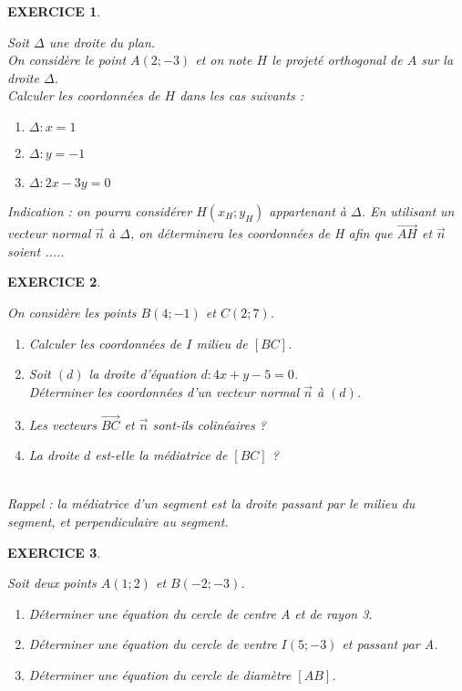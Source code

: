 \documentclass[a4paper]{article}   %
\renewcommand{\(}{\left(}
\renewcommand{\)}{\right)}
\newtheorem{EXO}{\large EXERCICE }
\newenvironment{EX}   { \setcounter{ques}{0} \begin{EXO} \hrulefill ~\vspace{0.3cm}

\normalfont}    {\end{EXO} \medskip}
\def\v{\overrightarrow}	%
\begin{document}
\begin{EX} Soit $\Delta$ une droite du plan.\\ On considère le point $A(2;-3)$ et on note $H$ le projeté orthogonal de $A$ sur la droite $\Delta$. \\
Calculer les coordonnées de $H$ dans les cas suivants :
\begin{enumerate}
\item $\Delta : x=1$
\item $\Delta : y=-1$
\item $\Delta : 2x-3y=0$
\end{enumerate}
{\small{Indication : on pourra considérer $H(x_H;y_H)$ appartenant à $\Delta$. En utilisant un vecteur normal $\v{n}$ à $\Delta$, on déterminera les coordonnées de H afin que $\v{AH}$ et $\v{n}$ soient ..... }}
\end{EX}

\begin{EX} On considère les points $B(4;-1)$ et $C(2;7)$. \begin{enumerate}
\item Calculer les coordonnées de $I$ milieu de $[BC]$. 
\item Soit $(d)$ la droite d'équation $d:4x+y-5=0$. \\
Déterminer les coordonnées d'un vecteur normal $\v{n}$ à $(d)$. 
\item Les vecteurs $\v{BC}$ et $\v{n}$ sont-ils colinéaires ?
\item La droite $d$ est-elle la médiatrice de $[BC]$ ?
\end{enumerate} 

~~\\
{\small{Rappel : la médiatrice d'un segment est la droite passant par le milieu du segment, et perpendiculaire au segment.}}
\end{EX}

\begin{EX}
Soit deux points $A(1;2)$ et $B(-2;-3)$. 
\begin{enumerate}
\item Déterminer une équation du cercle de centre A et de rayon 3.
\item Déterminer une équation du cercle de ventre $I(5;-3)$ et passant par A.
\item Déterminer une équation du cercle de diamètre $[AB]$.
\end{enumerate}

\end{EX}
\end{document}
